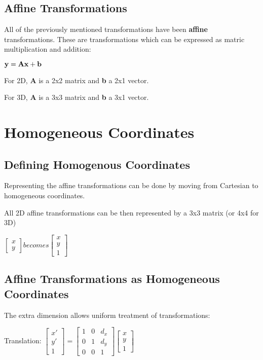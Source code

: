 \documentclass{article}
\begin{document}
\subsection{Affine Transformations}
All of the previously mentioned transformations have been {\bf affine} transformations. These are transformations which can be expressed as matric multiplication and addition: 

\centerline{$ \bf y = Ax + b $} 

For 2D, {\bf A} is a 2x2 matrix and {\bf b} a 2x1 vector.

For 3D, {\bf A} is a 3x3 matrix and {\bf b} a 3x1 vector.  

\section{Homogeneous Coordinates}
\subsection{Defining Homogenous Coordinates}
Representing the affine transformations can be done by moving from Cartesian to homogeneous coordinates.

All 2D affine transformations can be then represented by a 3x3 matrix (or 4x4 for 3D)

\centerline{$
	\begin{bmatrix}
		x \\ y
	\end{bmatrix}
	becomes
	\begin{bmatrix}
		x \\ y \\ 1
	\end{bmatrix}
$}

\subsection{Affine Transformations as Homogeneous Coordinates}
The extra dimension allows uniform treatment of transformations:

Translation: $\begin{bmatrix}x' \\ y' \\ 1 \end{bmatrix}
= \begin{bmatrix}1&0&d_x\\0&1&d_y\\0&0&1\end{bmatrix}
\begin{bmatrix} x\\y\\1\end{bmatrix}$ 
\end{document}
